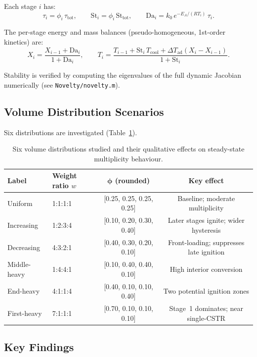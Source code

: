 \documentclass[11pt,a4paper]{article}
\newcommand{\dTad}{\Delta T_{\mathrm{ad}}}
\newcommand{\Tcool}{T_{\mathrm{cool}}}
\newcommand{\St}{\mathrm{St}}
\begin{document}
Each stage $i$ has:
\begin{equation}
  \tau_i = \phi_i\,\tau_{\mathrm{tot}}, \qquad
  \St_i  = \phi_i\,\St_{\mathrm{tot}},  \qquad
  \mathrm{Da}_i = k_0\,e^{-E_A/(RT_i)}\,\tau_i.
\end{equation}

The per-stage energy and mass balances (pseudo-homogeneous, 1st-order kinetics) are:
\begin{equation}
  X_i = \frac{X_{i-1}+\mathrm{Da}_i}{1+\mathrm{Da}_i}, \qquad
  T_i = \frac{T_{i-1}+\St_i\,\Tcool + \dTad(X_i-X_{i-1})}{1+\St_i}.
\end{equation}

Stability is verified by computing the eigenvalues of the full dynamic Jacobian
numerically (see \texttt{Novelty/}\allowbreak\texttt{novelty.m}).

\subsection{Volume Distribution Scenarios}

Six distributions are investigated (Table~\ref{tab:novelty}).

\begin{table}[h!]
\centering
\caption{Six volume distributions studied and their qualitative effects
         on steady-state multiplicity behaviour.}
\label{tab:novelty}
\renewcommand{\arraystretch}{1.18}
\begin{tabular}{@{}llcc@{}}
\toprule
Label & Weight ratio $w$ & $\bm{\phi}$ (rounded) & Key effect \\
\midrule
Uniform        & 1:1:1:1 & [0.25, 0.25, 0.25, 0.25] & Baseline; moderate multiplicity \\
Increasing     & 1:2:3:4 & [0.10, 0.20, 0.30, 0.40] & Later stages ignite; wider hysteresis \\
Decreasing     & 4:3:2:1 & [0.40, 0.30, 0.20, 0.10] & Front-loading; suppresses late ignition \\
Middle-heavy   & 1:4:4:1 & [0.10, 0.40, 0.40, 0.10] & High interior conversion \\
End-heavy      & 4:1:1:4 & [0.40, 0.10, 0.10, 0.40] & Two potential ignition zones \\
First-heavy    & 7:1:1:1 & [0.70, 0.10, 0.10, 0.10] & Stage~1 dominates; near single-CSTR \\
\bottomrule
\end{tabular}
\end{table}

\subsection{Key Findings}
\end{document}
